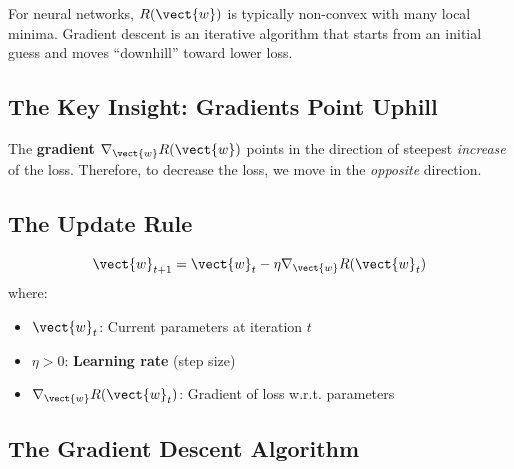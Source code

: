 For neural networks, $R(\vect{w})$ is typically non-convex with many local minima. Gradient descent is an iterative algorithm that starts from an initial guess and moves ``downhill'' toward lower loss.

\subsection{The Key Insight: Gradients Point Uphill}

The \textbf{gradient} $\nabla_{\vect{w}} R(\vect{w})$ points in the direction of steepest \textit{increase} of the loss. Therefore, to decrease the loss, we move in the \textit{opposite} direction.

\begin{center}
\end{center}

\subsection{The Update Rule}

\begin{definitionbox}
\[
\vect{w}_{t+1} = \vect{w}_t - \eta \nabla_{\vect{w}} R(\vect{w}_t)
\]
where:
\begin{itemize}
    \item $\vect{w}_t$: Current parameters at iteration $t$
    \item $\eta > 0$: \textbf{Learning rate} (step size)
    \item $\nabla_{\vect{w}} R(\vect{w}_t)$: Gradient of loss w.r.t. parameters
\end{itemize}
\end{definitionbox}

\subsection{The Gradient Descent Algorithm}

